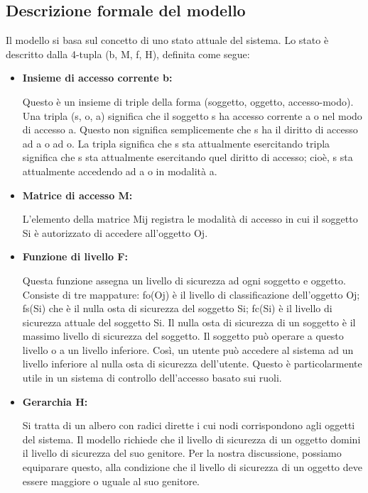 \subsection{Descrizione formale del modello}
Il modello si basa sul concetto di uno stato attuale del sistema. Lo stato è descritto dalla 4-tupla (b, M, f, H), definita come segue:
\begin{itemize}
    \item \textbf{Insieme di accesso corrente b:}
    
    Questo è un insieme di triple della forma (soggetto, oggetto, accesso-modo). Una tripla (s, o, a) significa che il soggetto s ha accesso corrente a o nel modo di accesso a. Questo non significa semplicemente che s ha il diritto di accesso ad a o ad o. La tripla significa che s sta attualmente esercitando tripla significa che s sta attualmente esercitando quel diritto di accesso; cioè, s sta attualmente accedendo ad a o in modalità a.
    
    \item \textbf{Matrice di accesso M:}
    
    L'elemento della matrice Mij registra le modalità di accesso in cui il soggetto Si è autorizzato di accedere all'oggetto Oj.
    
    \item \textbf{Funzione di livello F:}
    
    Questa funzione assegna un livello di sicurezza ad ogni soggetto e oggetto. Consiste di tre mappature: fo(Oj) è il livello di classificazione dell'oggetto Oj; fs(Si) che è il nulla osta di sicurezza del soggetto Si; fc(Si) è il livello di sicurezza attuale del soggetto Si. Il nulla osta di sicurezza di un soggetto è il massimo livello di sicurezza del soggetto. Il soggetto può operare a questo livello o a un livello inferiore. Così, un utente può accedere al sistema ad un livello inferiore al nulla osta di sicurezza dell'utente. Questo è particolarmente utile in un sistema di controllo dell'accesso basato sui ruoli.
    
    \item \textbf{Gerarchia H:}
    
    Si tratta di un albero con radici dirette i cui nodi corrispondono agli oggetti del sistema. Il modello richiede che il livello di sicurezza di un oggetto domini il livello di sicurezza del suo genitore. Per la nostra discussione, possiamo equiparare questo, alla condizione che il livello di sicurezza di un oggetto deve essere maggiore o uguale al suo genitore.
\end{itemize}

